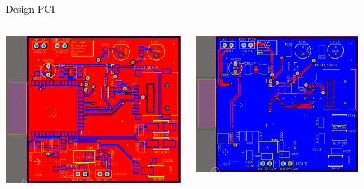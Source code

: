 \begin{frame}{Design PCI}
{\begin{columns}
    
                \centering
                \includegraphics[width=\linewidth]{figuras/cap3/pcb/pcb_top_plane.png}
            
                \centering
                \includegraphics[width=\linewidth]{figuras/cap3/pcb/pcb_bottom_plane.png}
                

\end{columns}}
\end{frame}
